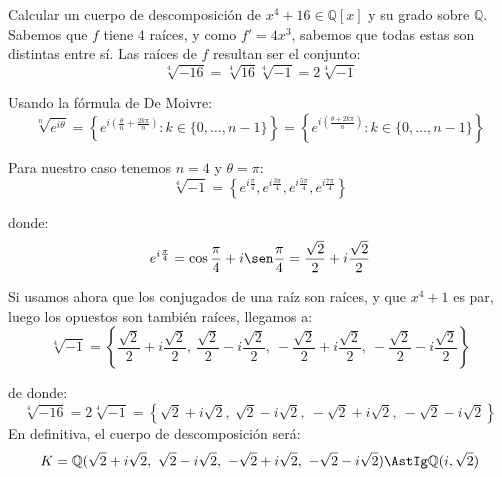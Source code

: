 \begin{ejercicio}
    Calcular un cuerpo de descomposición de $x^4+16\in \mathbb{Q}[x]$ y su grado sobre $\mathbb{Q}$.\\

    \noindent
    Sabemos que $f$ tiene 4 raíces, y como $f'=4x^3$, sabemos que todas estas son distintas entre sí. Las raíces de $f$ resultan ser el conjunto:
    \begin{equation*}
        \sqrt[4]{-16} = \sqrt[4]{16}\sqrt[4]{-1} = 2\sqrt[4]{-1}
    \end{equation*}

    Usando la fórmula de De Moivre:
    \begin{equation*}
        \sqrt[n]{e^{i\theta}} = \left\{e^{i\left(\frac{\theta}{n}+\frac{2k\pi}{n}\right)}: k \in \{0,\ldots,n-1\}\right\} = \left\{e^{i\left(\frac{\theta+2k\pi}{n}\right)}:k \in \{0,\ldots,n-1\}\right\}
    \end{equation*}

    Para nuestro caso tenemos $n=4$ y $\theta = \pi$:
    \begin{equation*}
        \sqrt[4]{-1} = \left\{e^{i\frac{\pi}{4}}, e^{i\frac{3\pi}{4}}, e^{i\frac{5\pi}{4}}, e^{i\frac{7\pi}{4}}\right\}
    \end{equation*}

    donde:
    \begin{equation*}
        e^{i\frac{\pi}{4}} = \cos\frac{\pi}{4} + i\sen\frac{\pi}{4} = \frac{\sqrt{2}}{2} + i\frac{\sqrt{2}}{2}
    \end{equation*}

    Si usamos ahora que los conjugados de una raíz son raíces, y que $x^4+1$ es par, luego los opuestos son también raíces, llegamos a:
    \begin{equation*}
        \sqrt[4]{-1} = \left\{\frac{\sqrt{2}}{2} + i\frac{\sqrt{2}}{2},~\frac{\sqrt{2}}{2} - i\frac{\sqrt{2}}{2},~-\frac{\sqrt{2}}{2} + i\frac{\sqrt{2}}{2},~-\frac{\sqrt{2}}{2} - i\frac{\sqrt{2}}{2}\right\}
    \end{equation*}

    de donde:
    \begin{equation*}
        \sqrt[4]{-16} = 2\sqrt[4]{-1} = \left\{\sqrt{2} + i\sqrt{2},~\sqrt{2} - i\sqrt{2},~-\sqrt{2} + i\sqrt{2},~-\sqrt{2} - i\sqrt{2}\right\}
    \end{equation*}
    En definitiva, el cuerpo de descomposición será:
    \begin{equation*}
        K = \mathbb{Q}(\sqrt{2} + i\sqrt{2},~\sqrt{2} - i\sqrt{2},~-\sqrt{2} + i\sqrt{2},~-\sqrt{2} - i\sqrt{2}) \AstIg \mathbb{Q}(i,\sqrt{2})
    \end{equation*}


\end{ejercicio}
